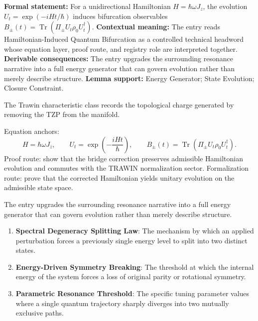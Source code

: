 \begingroup\footnotesize\setlength{\emergencystretch}{3em}\sloppy
\textbf{Formal statement:} For a unidirectional Hamiltonian \(H=\hbar\omega J_z\), the evolution \(U_t=\exp(-iHt/\hbar)\) induces bifurcation observables \(B_\pm(t)=\operatorname{Tr}(\Pi_\pm U_t\rho_0U_t^\dagger)\). \textbf{Contextual meaning:} The entry reads Hamiltonian-Induced Quantum Bifurcation as a controlled technical headword whose equation layer, proof route, and registry role are interpreted together. \textbf{Derivable consequences:} The entry upgrades the surrounding resonance narrative into a full energy generator that can govern evolution rather than merely describe structure. \textbf{Lemma support:} Energy Generator; State Evolution; Closure Constraint.\par
\endgroup

The Trawin characteristic class records the topological charge generated by removing the TZP from the manifold.

Equation anchors:
\[
H=\hbar\omega J_z,
\qquad
U_t=\exp\!\left(-\frac{iHt}{\hbar}\right),
\qquad
B_\pm(t)=\operatorname{Tr}\!\left(\Pi_\pm U_t\rho_0U_t^\dagger\right).
\]
Proof route: show that the bridge correction preserves admissible Hamiltonian evolution and commutes with the TRAWIN normalization sector. Formalization route: prove that the corrected Hamiltonian yields unitary evolution on the admissible state space.

The entry upgrades the surrounding resonance narrative into a full energy generator that can govern evolution rather than merely describe structure.
\endgroup

\begin{enumerate}[leftmargin=1.6em,itemsep=6pt,topsep=4pt]
\item \textbf{Spectral Degeneracy Splitting Law}: The mechanism by which an applied perturbation forces a previously single energy level to split into two distinct states.
\item \textbf{Energy-Driven Symmetry Breaking}: The threshold at which the internal energy of the system forces a loss of original parity or rotational symmetry.
\item \textbf{Parametric Resonance Threshold}: The specific tuning parameter values where a single quantum trajectory sharply diverges into two mutually exclusive paths.
\end{enumerate}

